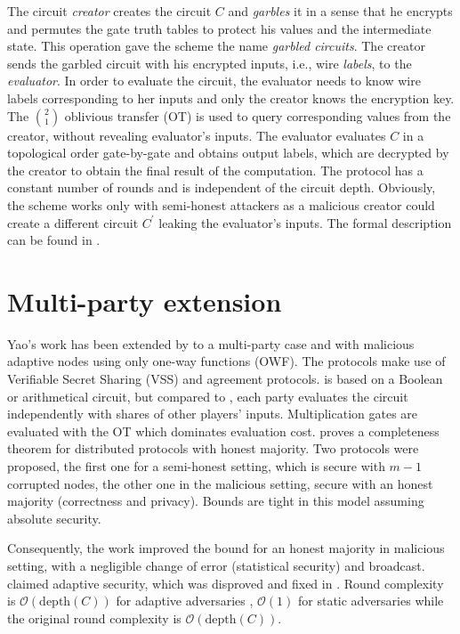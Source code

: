 \documentclass[
  digital, %
  twoside, %
  table,   %
  lof,     %
  lot,     %
]{fithesis3}
\newcommand{\bigO}[0]{\mathcal{O}}
\newcounter{ph4_show_guides}
\theoremstyle{definition}
\theoremstyle{remark}
\begin{document}
The circuit \emph{creator} creates the circuit $C$ and \emph{garbles} it in a sense that he encrypts and permutes the gate truth tables to protect his values and the intermediate state. This operation gave the scheme the name \emph{garbled circuits}. The creator sends the garbled circuit with his encrypted inputs, i.e., wire \emph{labels}, to the \emph{evaluator}. In order to evaluate the circuit, the evaluator needs to know wire labels corresponding to her inputs and only the creator knows the encryption key. The $\binom{2}{1}$ oblivious transfer (OT) is used to query corresponding values from the creator, without revealing evaluator's inputs. The evaluator evaluates $C$ in a topological order gate-by-gate and obtains output labels, which are decrypted by the creator to obtain the final result of the computation. The protocol has a constant number of rounds and is independent of the circuit depth. 
Obviously, the scheme works only with semi-honest attackers as a malicious creator could create a different circuit $C^\prime$ leaking the evaluator's inputs. The formal description can be found in \cite{BHR12}. 

\section{Multi-party extension}\label{sec:soa:mpc}%
Yao's work has been extended by \cite{GMW87} to a multi-party case and with malicious adaptive nodes using only one-way functions (OWF). The protocols make use of Verifiable Secret Sharing (VSS) and agreement protocols. \cite{GMW87} is based on a Boolean or arithmetical circuit, but compared to \cite{Yao86}, each party evaluates the circuit independently with shares of other players' inputs. Multiplication gates are evaluated with the OT which dominates evaluation cost. \cite{GMW87} proves a completeness theorem for distributed protocols with honest majority. Two protocols were proposed, the first one for a semi-honest setting, which is secure with $m-1$ corrupted nodes, the other one in the malicious setting, secure with an honest majority (correctness and privacy). Bounds are tight in this model assuming absolute security. 

Consequently, the work \cite{RB89, B91} improved the bound for an honest majority in malicious setting, with a negligible change of error (statistical security) and broadcast.
\cite{RB89} claimed adaptive security, which was disproved and fixed in \cite{CDDHR99}.
Round complexity is $\bigO(\text{depth}(C))$ for adaptive adversaries \cite{GMW87, CDDHR99}, $\bigO(1)$ for static adversaries \cite{BMR90} while the original \cite{GMW87} round complexity is $\bigO(\text{depth}(C))$.
\end{document}
